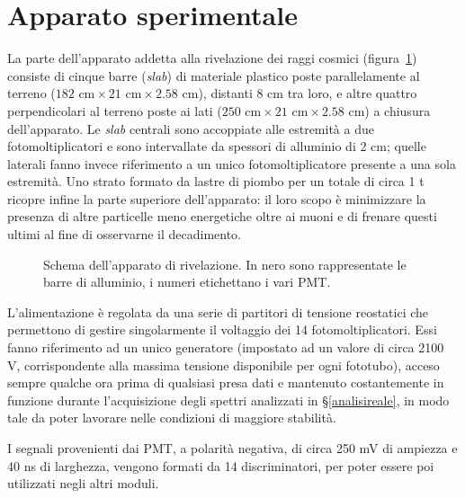 \documentclass[10pt, oneside, a4paper]{article}   	%
\begin{document}
\section{Apparato sperimentale}
La parte dell'apparato addetta alla rivelazione dei raggi cosmici (figura~\ref{appScheme}) consiste di cinque barre (\emph{slab}) di materiale plastico poste parallelamente al terreno ($182 \text{ cm}\times21\text{ cm}\times2.58$ cm), distanti 8 cm tra loro, e altre quattro perpendicolari al terreno poste ai lati ($250\text{ cm}\times21\text{ cm}\times2.58$ cm) a chiusura dell'apparato. Le \emph{slab} centrali sono accoppiate alle estremità a due fotomoltiplicatori e sono intervallate da spessori di alluminio di 2 cm; quelle laterali fanno invece riferimento a un unico fotomoltiplicatore presente a una sola estremità. Uno strato formato da lastre di piombo per un totale di circa 1 t ricopre infine la parte superiore dell'apparato: il loro scopo è minimizzare la presenza di altre particelle meno energetiche oltre ai muoni e di frenare questi ultimi al fine di osservarne il decadimento.
%
\begin{figure}[h]
	\centering
		
	\caption{Schema dell'apparato di rivelazione. In nero sono rappresentate le barre di alluminio, i numeri etichettano i vari PMT.}
	\label{appScheme}
\end{figure}
%
L'alimentazione è regolata da una serie di partitori di tensione reostatici che permettono di gestire singolarmente il voltaggio dei 14 fotomoltiplicatori. Essi fanno riferimento ad un unico generatore (impostato ad un valore di circa 2100 V, corrispondente alla massima tensione disponibile per ogni fototubo), acceso sempre qualche ora prima di qualsiasi presa dati e mantenuto costantemente in funzione durante l'acquisizione degli spettri analizzati in \S\ref{analisireale}, in modo tale da poter lavorare nelle condizioni di maggiore stabilità.

I segnali provenienti dai PMT, a polarità negativa, di circa 250 mV di ampiezza e 40 ns di larghezza, vengono formati da 14 discriminatori, per poter essere poi utilizzati negli altri moduli.
%
%
\end{document}
